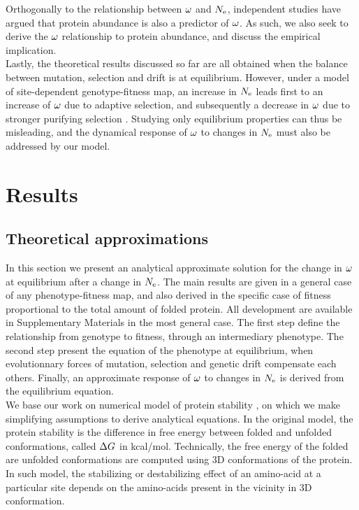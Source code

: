 \documentclass{article}
\begin{document}
Orthogonally to the relationship between $\omega$ and $N_{\mathrm{e}}$, independent studies have argued that protein abundance is also a predictor of $\omega$.
As such, we also seek to derive the $\omega$ relationship to protein abundance, and discuss the empirical implication.\\

Lastly, the theoretical results discussed so far are all obtained when the balance between mutation, selection and drift is at equilibrium.
However, under a model of site-dependent genotype-fitness map, an increase in $N_{\mathrm{e}}$ leads first to an increase of $\omega$ due to adaptive selection, and subsequently a decrease in $\omega$ due to stronger purifying selection \cite{Jones2016}.
Studying only equilibrium properties can thus be misleading, and the dynamical response of $\omega$ to changes in $N_{\mathrm{e}}$ must also be addressed by our model.\\

\section*{Results}
\subsection*{Theoretical approximations}
In this section we present an analytical approximate solution for the change in $\omega$ at equilibrium after a change in $N_{\mathrm{e}}$.
The main results are given in a general case of any phenotype-fitness map, and also derived in the specific case of fitness proportional to the total amount of folded protein.
All development are available in Supplementary Materials in the most general case.
The first step define the relationship from genotype to fitness, through an intermediary phenotype.
The second step present the equation of the phenotype at equilibrium, when evolutionnary forces of mutation, selection and genetic drift compensate each others.
Finally, an approximate response of $\omega$ to changes in $N_{\mathrm{e}}$ is derived from the equilibrium equation. \\

We base our work on numerical model of protein stability \cite{Williams2006, Goldstein2011, Pollock2012}, on which we make simplifying assumptions to derive analytical equations.
In the original model, the protein stability is the difference in free energy between folded and unfolded conformations, called $\Delta G$ in kcal/mol.
Technically, the free energy of the folded are unfolded conformations are computed using $3$D conformations of the protein.
In such model, the stabilizing or destabilizing effect of an amino-acid at a particular site depends on the amino-acids present in the vicinity in $3$D conformation.\\
\end{document}
